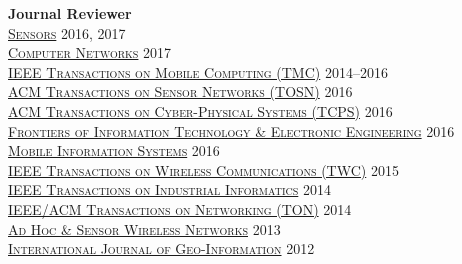 {\bf Journal Reviewer}\\
{\href{http://www.mdpi.com/journal/sensors}{\textsc{Sensors}}} \hfill 2016, 2017\\
{\href{http://ees.elsevier.com/comnet/}{\textsc{Computer Networks}}} \hfill 2017\\
{\href{http://www.computer.org/portal/web/tmc}{\textsc{IEEE Transactions on Mobile Computing (TMC)}}} \hfill 2014--2016\\
{\href{http://tosn.acm.org/}{\textsc{ACM Transactions on Sensor Networks (TOSN)}}} \hfill 2016\\
{\href{http://tcps.acm.org/}{\textsc{ACM Transactions on Cyber-Physical Systems (TCPS)}}} \hfill 2016\\
{\href{http://www.springer.com/computer/journal/11714}{\textsc{Frontiers of Information Technology \& Electronic Engineering}}} \hfill 2016\\
{\href{https://www.hindawi.com/journals/misy/}{\textsc{Mobile Information Systems}}} \hfill 2016\\
{\href{http://www.comsoc.org/twc}{\textsc{IEEE Transactions on Wireless Communications (TWC)}}} \hfill 2015\\
{\href{http://tii.ieee-ies.org}{\textsc{IEEE Transactions on Industrial Informatics}}} \hfill 2014\\
{\href{http://www.ifp.illinois.edu/ton}{\textsc{IEEE/ACM Transactions on Networking (TON)}}} \hfill 2014\\
{\href{http://www.oldcitypublishing.com/AHSWN/AHSWN.html}{\textsc{Ad Hoc \& Sensor Wireless Networks}}} \hfill 2013\\
{\href{http://www.mdpi.com/journal/ijgi}{\textsc{International Journal of Geo-Information}}} \hfill 2012\\
